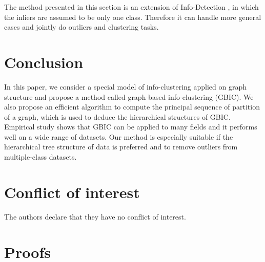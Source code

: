 The method presented in this section is an extension of Info-Detection \citep{zhao2019info}, in which the inliers are assumed to be only one class. Therefore it can handle more general cases and
jointly do outliers and clustering tasks.

\section{Conclusion}\label{sec:conc}
In this paper, we consider a special model of info-clustering applied on graph structure and propose a method called graph-based info-clustering (GBIC). We also propose an efficient algorithm to compute the principal sequence of partition of a graph, which is used to deduce the hierarchical structures of GBIC. Empirical study shows that GBIC can be applied to many fields and it performs well on a wide range of datasets. Our method is especially suitable if the hierarchical tree structure of data is preferred and to remove outliers from multiple-class datasets.


%
\section*{Conflict of interest}
%
The authors declare that they have no conflict of interest.



%
%
\appendix
\section{Proofs}
